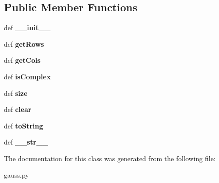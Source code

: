 \subsection*{Public Member Functions}
\begin{DoxyCompactItemize}
\item 
\hypertarget{classgauss_1_1_g_e_symbol_aba21254ad50d96ff1812ed27d9910946}{def {\bfseries \-\_\-\-\_\-init\-\_\-\-\_\-}}\label{classgauss_1_1_g_e_symbol_aba21254ad50d96ff1812ed27d9910946}

\item 
\hypertarget{classgauss_1_1_g_e_symbol_a2a78ac7f538814a06b2a0e021e88cbba}{def {\bfseries get\-Rows}}\label{classgauss_1_1_g_e_symbol_a2a78ac7f538814a06b2a0e021e88cbba}

\item 
\hypertarget{classgauss_1_1_g_e_symbol_a7e33c74f667d5c2ef238344cd1aec4db}{def {\bfseries get\-Cols}}\label{classgauss_1_1_g_e_symbol_a7e33c74f667d5c2ef238344cd1aec4db}

\item 
\hypertarget{classgauss_1_1_g_e_symbol_a7b3a97ffe38b2cb4111da365500a55b9}{def {\bfseries is\-Complex}}\label{classgauss_1_1_g_e_symbol_a7b3a97ffe38b2cb4111da365500a55b9}

\item 
\hypertarget{classgauss_1_1_g_e_symbol_acc21abfdd72d61d86cf2c5efdad1c7a9}{def {\bfseries size}}\label{classgauss_1_1_g_e_symbol_acc21abfdd72d61d86cf2c5efdad1c7a9}

\item 
\hypertarget{classgauss_1_1_g_e_symbol_a6812f4b31cf1afedd99fabceae0293be}{def {\bfseries clear}}\label{classgauss_1_1_g_e_symbol_a6812f4b31cf1afedd99fabceae0293be}

\item 
\hypertarget{classgauss_1_1_g_e_symbol_aa20cb6a4a5de5c4fff7273f678de77b8}{def {\bfseries to\-String}}\label{classgauss_1_1_g_e_symbol_aa20cb6a4a5de5c4fff7273f678de77b8}

\item 
\hypertarget{classgauss_1_1_g_e_symbol_affd7a896b26ffe343d3dc946532690c1}{def {\bfseries \-\_\-\-\_\-str\-\_\-\-\_\-}}\label{classgauss_1_1_g_e_symbol_affd7a896b26ffe343d3dc946532690c1}

\end{DoxyCompactItemize}


The documentation for this class was generated from the following file\-:\begin{DoxyCompactItemize}
\item 
gauss.\-py\end{DoxyCompactItemize}
